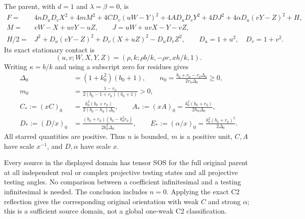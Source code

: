The parent, with $d=1$ and $\lambda=\beta=0$, is
\begin{align*}
 F={}&4nD_uD_vX^2+4mM^2+4CD_v(uW-Y)^2+4AD_uD_vY^2
                +4DJ^2+4\alpha D_u(vY-Z)^2+H,\\
 M={}&vW-X+uvY-uZ,\qquad J=uW+uvX-Y-vZ,\\
 H/2={}&J^2+D_u(vY-Z)^2+D_v(X+uZ)^2-D_uD_vZ^2,
 \qquad D_u=1+u^2,\quad D_v=1+v^2.
\end{align*}
Its exact stationary contact is
\[
 (u,v;W,X,Y,Z)=(\rho,k;\rho b/k,-\rho r,xh/k,1).
\]
Writing $\kappa=b/k$ and using a subscript zero for residues gives
\begin{align*}
 \Delta_0&=(1+k_0^2)(b_0+1),\qquad
 n_0=\frac{b_0+r_0-r_0\Delta_0}{2r_0\Delta_0}\geq0,\\
 m_0&=\frac{1-r_0}{2(b_0-1+r_0)(b_0+1)}>0,\\
 C_*:=(xC)_0&=\frac{k_0^2(b_0+r_0)}{2(b_0-h_0)\Delta_0},\qquad
 A_*:=(xA)_0=\frac{k_0^2(b_0+r_0)}{2h_0\Delta_0},\\
 D_*:=(D/x)_0&=\frac{(b_0+r_0)(b_0-k_0^2r_0)}{2k_0^2\Delta_0},\qquad
 E_*:=(\alpha/x)_0=\frac{k_0^2(b_0+r_0)^2}{2\Delta_0}.
\end{align*}
All starred quantities are positive.  Thus $n$ is bounded, $m$ is a
positive unit, $C,A$ have scale $x^{-1}$, and $D,\alpha$ have scale $x$.

\begin{theorem}
\label{pec59340d644f:thm:c2-general-single-angle}
Every source in the displayed domain has tensor SOS for the full
original parent at all independent real or complex projective testing
states and all projective testing angles.  No comparison between a
coefficient infinitesimal and a testing infinitesimal is needed.
The conclusion includes $n=0$.  Applying the exact C2 reflection gives
the corresponding original orientation with weak $C$ and strong
$\alpha$; this is a sufficient source domain, not a global one-weak
C2 classification.
\end{theorem}

